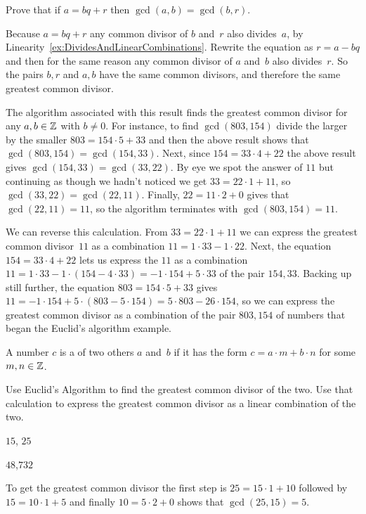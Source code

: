 \documentclass{ibl}
\begin{document}
\begin{bezoutproof}
\begin{ex}
Prove that if $a=bq+r$ then $\gcd(a,b)=\gcd(b,r)$.  
\begin{ans}
Because $a=bq+r$ any common divisor of $b$ and~$r$ also divides~$a$, 
by Linearity~\ref{ex:DividesAndLinearCombinations}.
Rewrite the equation as $r=a-bq$ and then for the same reason any
common divisor of $a$ and~$b$ also divides~$r$.
So the pairs $b,r$ and $a,b$ have the same common divisors, and
therefore the same greatest common divisor.
\end{ans}
\end{ex}

The algorithm associated with this result finds the greatest common
divisor for any $a,b\in\mathbb{Z}$ with $b\neq 0$.  
For instance, to find $\gcd(803,154)$ divide the larger by
the smaller $803=154\cdot 5+33$ and then the above result shows that  
$\gcd(803,154)=\gcd(154,33)$.
Next, since $154=33\cdot 4+22$ the above result gives
$\gcd(154,33)=\gcd(33,22)$.
By eye we spot the answer of $11$ but continuing as though we hadn't noticed
we get $33=22\cdot 1+11$, so $\gcd(33,22)=\gcd(22,11)$.
Finally, $22=11\cdot 2+0$ gives that 
$\gcd(22,11)=11$, so the algorithm terminates with $\gcd(803,154)=11$.

We can reverse this calculation.
From $33=22\cdot 1+11$ we can  
express the greatest common divisor~$11$ as a combination 
$11=1\cdot 33-1\cdot 22$.
Next, 
the equation $154=33\cdot 4+22$ lets us express
the $11$ as a combination 
$11=1\cdot 33-1\cdot (154-4\cdot 33)=-1\cdot 154+5\cdot 33$
of the pair $154,33$.
Backing up still further, the equation 
$803=154\cdot 5+33$
gives $11=-1\cdot 154+5\cdot (803-5\cdot 154)=5\cdot 803-26\cdot 154$, so 
we can express the greatest common divisor as a combination of the pair
$803,154$ of numbers that began the Euclid's algorithm example.


\begin{df}
A number $c$ is a  of two others $a$ and~$b$
if it has the form $c=a\cdot m+b\cdot n$ for some $m,n\in\mathbb{Z}$.  
\end{df}

\begin{ex}
Use Euclid's Algorithm to find the greatest common divisor of the two.
Use that calculation to express the greatest common divisor as a 
linear combination of the two.
\begin{exes}
\item $15$, $25$
\item $48$,$732$  
\end{exes}
\begin{ans}
\begin{exes}
\item To get the greatest common divisor the first step is
  $25=15\cdot 1+10$ followed by $15=10\cdot 1+5$ and finally
  $10=5\cdot 2+0$ shows that $\gcd(25,15)=5$.


\end{exes}
\end{ans}
\end{ex}
\end{bezoutproof}
\end{document}
